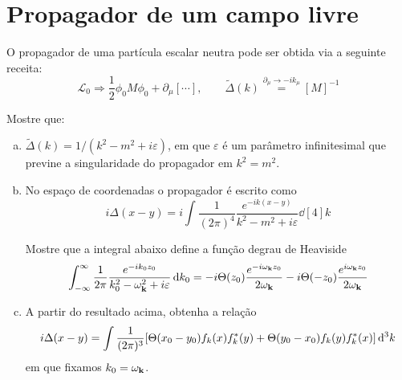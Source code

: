 \documentclass[a4paper, 11pt, oneside]{impression}
\begin{document}


\newpage

\chapter{Propagador de um campo livre}\label{quest: three}

\begin{exercise}{}
    O propagador de uma partícula escalar neutra pode ser obtida via a seguinte receita:
        \begin{equation*}
            \mathcal{L}_{0} \Rightarrow \dfrac{1}{2}\phi_{0} M \phi_{0} + \partial_{\mu}[\cdots], \qquad 
            \tilde{\Delta}(k) \overset{\partial_{\mu}\to-ik_{\mu}}{=} [M]^{-1}
        \end{equation*}
        
    \noindent Mostre que: \medskip

    \begin{enumerate}[(a)]
        \item $\tilde{\Delta}(k) = 1/(k^2 - m^2 + i\varepsilon)$, em que $\varepsilon$ é um parâmetro infinitesimal  que previne a singularidade do propagador em $k^2 = m^2$.

        \item No espaço de coordenadas o propagador é escrito como
        \begin{equation*}
            i\Delta(x-y) = i\int \dfrac{1}{(2\pi)^4}\dfrac{e^{-ik(x-y)}}{k^2-m^2+i\varepsilon}\dd[4]{k}
        \end{equation*}
        
        \noindent Mostre que a integral abaixo define a função degrau de Heaviside
        \begin{equation*}
            \int_{-\infty}^{\infty}\dfrac{1}{2\pi} \dfrac{e^{-ik_{0}z_{0}}}{k_{0}^2 - \omega_{\vb{k}}^2 + i\varepsilon} \dd{k_{0}} = -i\Theta(z_{0})\dfrac{e^{-i\omega_{\vb{k}}z_{0}}}{2\omega_{\vb{k}}} - i\Theta(-z_{0})\dfrac{e^{i\omega_{\vb{k}}z_{0}}}{2\omega_{\vb{k}}}
        \end{equation*}

        \item A partir do resultado acima, obtenha a relação
            \begin{equation*}
                i\Delta(x-y) = \int \dfrac{1}{(2\pi)^3}\qty[
                    \Theta(x_{0}-y_{0}) f_{k}(x) f_{k}^{\ast}(y) +
                    \Theta(y_{0}-x_{0}) f_{k}(y) f_{k}^{\ast}(x)
                ]\dd[3]{k}
            \end{equation*}
        em que fixamos $k_{0} = \omega_{\vb{k}}$.


\end{enumerate}
\end{exercise}
\end{document}
